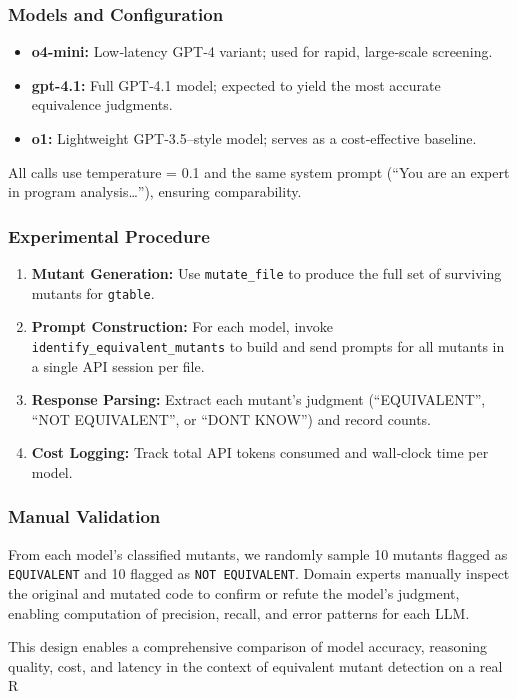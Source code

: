 \subsubsection{Models and Configuration}
\begin{itemize}
  \item \textbf{o4-mini:} Low‐latency GPT‐4 variant; used for rapid, large‐scale screening.
  \item \textbf{gpt-4.1:} Full GPT‐4.1 model; expected to yield the most accurate equivalence judgments.
  \item \textbf{o1:} Lightweight GPT‐3.5–style model; serves as a cost‐effective baseline.
\end{itemize}
All calls use temperature = 0.1 and the same system prompt (“You are an expert in program analysis…”), ensuring comparability.

\subsubsection{Experimental Procedure}
\begin{enumerate}
  \item \textbf{Mutant Generation:} Use \texttt{mutate\_file} to produce the full set of surviving mutants for \texttt{gtable}.  
  \item \textbf{Prompt Construction:} For each model, invoke \texttt{identify\_equivalent\_mutants} to build and send prompts for all mutants in a single API session per file.  
  \item \textbf{Response Parsing:} Extract each mutant’s judgment (“EQUIVALENT”, “NOT EQUIVALENT”, or “DONT KNOW”) and record counts.  
  \item \textbf{Cost Logging:} Track total API tokens consumed and wall‐clock time per model.
\end{enumerate}

\subsubsection{Manual Validation}
From each model’s classified mutants, we randomly sample 10 mutants flagged as \texttt{EQUIVALENT} and 10 flagged as \texttt{NOT EQUIVALENT}.  Domain experts manually inspect the original and mutated code to confirm or refute the model’s judgment, enabling computation of precision, recall, and error patterns for each LLM.

This design enables a comprehensive comparison of model accuracy, reasoning quality, cost, and latency in the context of equivalent mutant detection on a real R

